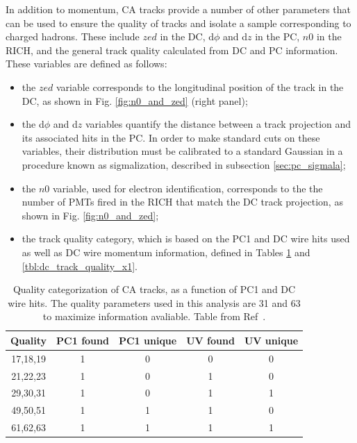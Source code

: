 In addition to momentum, CA tracks provide a number of other parameters that can be used to ensure the quality of tracks and isolate a sample corresponding to charged hadrons. These include $zed$ in the DC, d$\phi$ and d$z$ in the PC, $n0$ in the RICH, and the general track quality calculated from DC and PC information. These variables are defined as follows:
\begin{itemize}
\item the $zed$ variable corresponds to the longitudinal position of the track in the DC, as shown in Fig. \ref{fig:n0_and_zed} (right panel);
\item the d$\phi$ and d$z$ variables quantify the distance between a track projection and its associated hits in the PC. In order to make standard cuts on these variables, their distribution must be calibrated to a standard Gaussian in a procedure known as sigmalization, described in subsection \ref{sec:pc_sigmala};
\item the $n0$ variable, used for electron identification, corresponds to the the number of PMTs fired in the RICH that match the DC track projection, as shown in Fig. \ref{fig:n0_and_zed};
\item the track quality category, which is based on the PC1 and DC wire hits used as well as DC wire momentum information, defined in Tables \ref{tbl:dc_track_quality_pc1} and \ref{tbl:dc_track_quality_x1}.
\end{itemize}

\begin{table}[!ht]
\caption{Quality categorization of CA tracks, as a function of PC1 and DC wire hits. The quality parameters used in this analysis are 31 and 63 to maximize information avaliable. Table from Ref~\cite{Belmont:2012pka}.}
\begin{center}
    \begin{tabular}{ccccc}
    \hline
    Quality & PC1 found  & PC1 unique & UV found & UV unique\\ \hline
    17,18,19 & 1 & 0 & 0 & 0\\ \hline
    21,22,23 & 1 & 0 & 1 & 0\\ \hline
    29,30,31 & 1 & 0 & 1 & 1\\ \hline
    49,50,51 & 1 & 1 & 1 & 0\\ \hline
    61,62,63 & 1 & 1 & 1 & 1\\ \hline
    \end{tabular}
\end{center}
\label{tbl:dc_track_quality_pc1}
\end{table}

